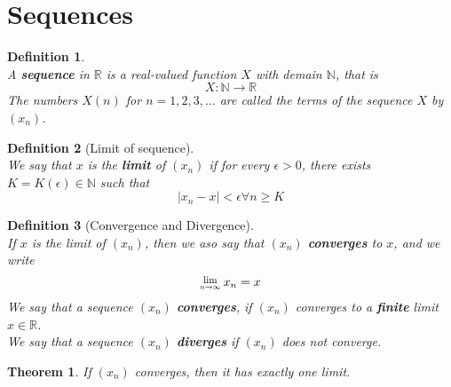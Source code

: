 \documentclass[8pt]{article}
\newcommand{\Lim}[1]{\raisebox{0.5ex}{\scalebox{0.8}{$\displaystyle \lim_{#1}\;$}}}
\newtheorem{definition}{Definition}[section]
\newtheorem{theorem}{Theorem}[section]
\theoremstyle{definition}
\begin{document}
\section{Sequences}
\begin{definition}
\hfill\\\normalfont A \textbf{sequence} in $\mathbb{R}$ is a real-valued function $X$ with demain $\mathbb{N}$, that is
\[
X:\mathbb{N}\to\mathbb{R}
\]
The numbers $X(n)$ for $n=1,2,3,\ldots$ are called the terms of the sequence $X$ by $(x_n)$.
\end{definition}
\begin{definition}[Limit of sequence]
\hfill\\\normalfont We say that $x$ is the \textbf{limit} of $(x_n)$ if for every $\epsilon>0$, there exists $K=K(\epsilon)\in\mathbb{N}$ such that
\[
|x_n-x|<\epsilon\forall n\geq K
\]
\end{definition}
\begin{definition}[Convergence and Divergence]
\hfill\\\normalfont If $x$ is the limit of $(x_n)$, then we aso say that $(x_n)$ \textbf{converges} to $x$, and we write
\[
\Lim{n\to\infty}x_n=x
\] 
We say that a sequence $(x_n)$ \textbf{converges}, if $(x_n)$ converges to a \textbf{finite} limit $x\in\mathbb{R}$.\\
We say that a sequence $(x_n)$ \textbf{diverges} if $(x_n)$ does not converge.
\end{definition}
\begin{theorem}\normalfont If $(x_n)$ converges, then it has exactly one limit.
\end{theorem}
\end{document}
